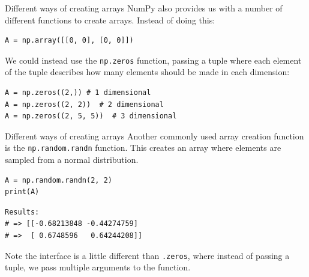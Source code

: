 \documentclass[10pt]{beamer}
\begin{document}
\begin{frame}[label={sec:orgc9951e4},fragile]{Different ways of creating arrays}
 NumPy also provides us with a number of different functions to create arrays. Instead
of doing this:

\begin{verbatim}
A = np.array([[0, 0], [0, 0]])
\end{verbatim}

We could instead use the \texttt{np.zeros} function, passing a tuple where each element of
the tuple describes how many elements should be made in each dimension:

\begin{verbatim}
A = np.zeros((2,)) # 1 dimensional
A = np.zeros((2, 2))  # 2 dimensional
A = np.zeros((2, 5, 5))  # 3 dimensional
\end{verbatim}
\end{frame}

\begin{frame}[label={sec:orgac685e7},fragile]{Different ways of creating arrays}
 Another commonly used array creation function is the \texttt{np.random.randn} function. This
creates an array where elements are sampled from a normal distribution.

\begin{verbatim}
A = np.random.randn(2, 2)
print(A)
\end{verbatim}

\begin{verbatim}
Results: 
# => [[-0.68213848 -0.44274759]
# =>  [ 0.6748596   0.64244208]]
\end{verbatim}


\alert{Note} the interface is a little different than \texttt{.zeros}, where instead of passing a
tuple, we pass multiple arguments to the function.
\end{frame}
\end{document}
